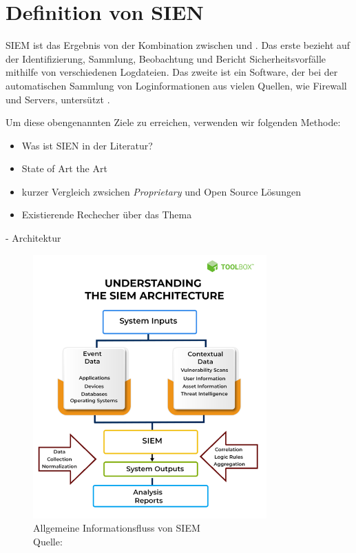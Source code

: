\section{Definition von SIEN}

\gls{SIEM} ist das Ergebnis von der Kombination zwischen  und . Das erste bezieht auf der Identifizierung, Sammlung, Beobachtung und Bericht Sicherheitsvorfälle mithilfe von verschiedenen Logdateien. Das zweite ist ein Software, der bei der automatischen Sammlung von Loginformationen aus vielen Quellen, wie Firewall und Servers, untersützt \cite{techopedia_SIM}.

Um diese obengenannten Ziele zu erreichen, verwenden wir folgenden Methode:

\begin{itemize}[noitemsep]
   \item Was ist SIEN in der Literatur?
   \item State of Art the Art
   \item kurzer Vergleich zwsichen \textit{\gls{Proprietary}} und \gls{Open Source} Lösungen
   \item Existierende Rechecher über das Thema
\end{itemize}


- Architektur %
\begin{figure}[H]
   \centering
   \includegraphics[width=0.8\textwidth]{assets/2_p1.png}
   \caption{Allgemeine Informationsfluss von \gls{SIEM} \\Quelle: \citep{Mohanan_What} }
   \centering
\end{figure}

